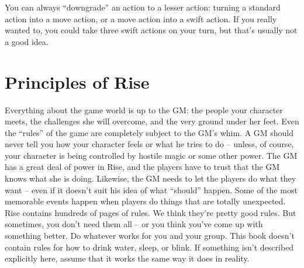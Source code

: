  You can always ``downgrade'' an action to a lesser action: turning a standard action into a move action, or a move action into a swift action. If you really wanted to, you could take three swift actions on your turn, but that's usually not a good idea.

\section{Principles of Rise}

\begin{itemize*}
     Everything about the game world is up to the GM: the people your character meets, the challenges she will overcome, and the very ground under her feet. Even the ``rules'' of the game are completely subject to the GM's whim.
     A GM should never tell you how your character feels or what he tries to do -- unless, of course, your character is being controlled by hostile magic or some other power.
     The GM has a great deal of power in Rise, and the players have to trust that the GM knows what she is doing. Likewise, the GM needs to let the players do what they want -- even if it doesn't suit his idea of what ``should'' happen. Some of the most memorable events happen when players do things that are totally unexpected.
     Rise contains hundreds of pages of rules. We think they're pretty good rules. But sometimes, you don't need them all -- or you think you've come up with something better. Do whatever works for you and your group.
     This book doesn't contain rules for how to drink water, sleep, or blink. If something isn't described explicitly here, assume that it works the same way it does in reality.
\end{itemize*}
